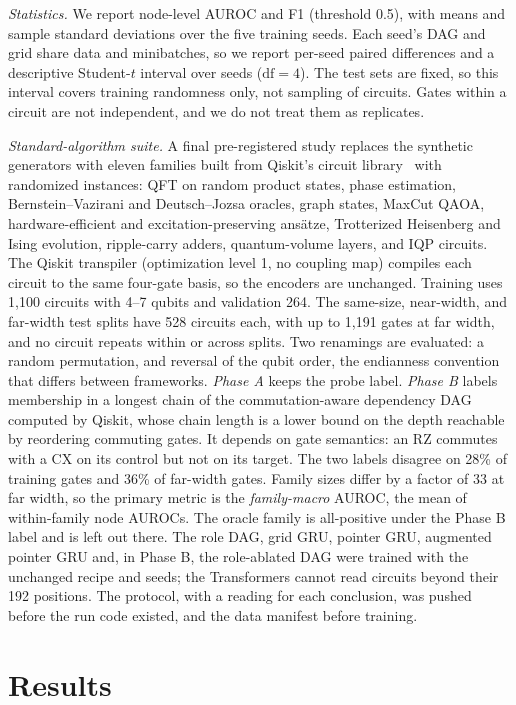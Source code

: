 \documentclass[conference,a4paper]{IEEEtran}
\begin{document}
\emph{Statistics.} We report node-level AUROC and F1 (threshold 0.5), with means and sample standard deviations over the five training seeds. Each seed's DAG and grid share data and minibatches, so we report per-seed paired differences and a descriptive Student-$t$ interval over seeds ($\mathrm{df}=4$). The test sets are fixed, so this interval covers training randomness only, not sampling of circuits. Gates within a circuit are not independent, and we do not treat them as replicates.

\emph{Standard-algorithm suite.} A final pre-registered study replaces the synthetic generators with eleven families built from Qiskit's circuit library~\cite{qiskit2024} with randomized instances: QFT on random product states, phase estimation, Bernstein--Vazirani and Deutsch--Jozsa oracles, graph states, MaxCut QAOA, hardware-efficient and excitation-preserving ans\"atze, Trotterized Heisenberg and Ising evolution, ripple-carry adders, quantum-volume layers, and IQP circuits. The Qiskit transpiler (optimization level 1, no coupling map) compiles each circuit to the same four-gate basis, so the encoders are unchanged. Training uses 1,100 circuits with 4--7 qubits and validation 264. The same-size, near-width, and far-width test splits have 528 circuits each, with up to 1,191 gates at far width, and no circuit repeats within or across splits. Two renamings are evaluated: a random permutation, and reversal of the qubit order, the endianness convention that differs between frameworks. \emph{Phase A} keeps the probe label. \emph{Phase B} labels membership in a longest chain of the commutation-aware dependency DAG~\cite{iten2022pattern} computed by Qiskit, whose chain length is a lower bound on the depth reachable by reordering commuting gates. It depends on gate semantics: an RZ commutes with a CX on its control but not on its target. The two labels disagree on 28\% of training gates and 36\% of far-width gates. Family sizes differ by a factor of 33 at far width, so the primary metric is the \emph{family-macro} AUROC, the mean of within-family node AUROCs. The oracle family is all-positive under the Phase B label and is left out there. The role DAG, grid GRU, pointer GRU, augmented pointer GRU and, in Phase B, the role-ablated DAG were trained with the unchanged recipe and seeds; the Transformers cannot read circuits beyond their 192 positions. The protocol, with a reading for each conclusion, was pushed before the run code existed, and the data manifest before training.

\section{Results}
\end{document}
